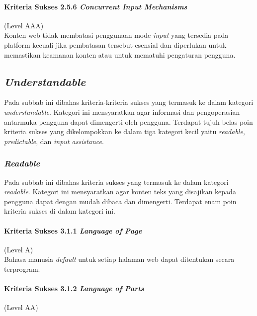 \paragraph{Kriteria Sukses 2.5.6 \textit{Concurrent Input Mechanisms}}
\label{sec:kriteria_sukses_2.5.6}
(Level AAA)\\

Konten web tidak membatasi penggunaan mode \textit{input} yang tersedia pada platform kecuali jika pembatasan tersebut esensial dan diperlukan untuk memastikan keamanan konten atau untuk mematuhi pengaturan pengguna.


\subsection{\textit{Understandable}}
\label{sec:understandable}
Pada subbab ini dibahas kriteria-kriteria sukses yang termasuk ke dalam kategori \textit{understandable}. Kategori ini mensyaratkan agar informasi dan pengoperasian antarmuka pengguna dapat dimengerti oleh pengguna. Terdapat tujuh belas poin kriteria sukses yang dikelompokkan ke dalam tiga kategori kecil yaitu \textit{readable}, \textit{predictable}, dan \textit{input assistance}.

\subsubsection{\textit{Readable}}
\label{sec:readable}
Pada subbab ini dibahas kriteria sukses yang termasuk ke dalam kategori \textit{readable}. Kategori ini mensyaratkan agar konten teks yang disajikan kepada pengguna dapat dengan mudah dibaca dan dimengerti. Terdapat enam poin kriteria sukses di dalam kategori ini.

\paragraph{Kriteria Sukses 3.1.1 \textit{Language of Page}}
\label{sec:kriteria_sukses_3.1.1}
(Level A)\\

Bahasa manusia \textit{default} untuk setiap halaman web dapat ditentukan secara terprogram.

\paragraph{Kriteria Sukses 3.1.2 \textit{Language of Parts}}
\label{sec:kriteria_sukses_3.1.2}
(Level AA)\\


